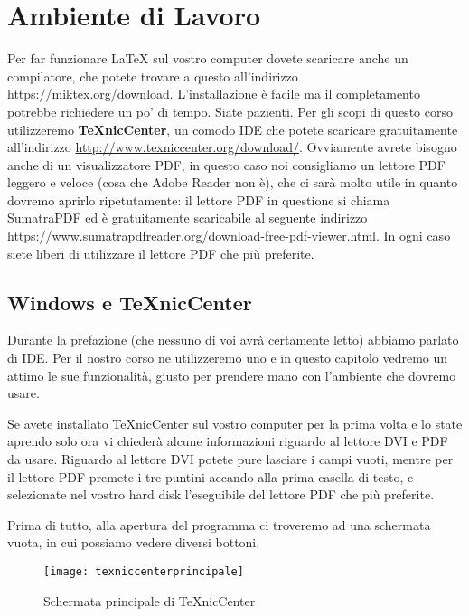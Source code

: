 \chapter{ Ambiente di Lavoro}

Per far funzionare \LaTeX{} sul vostro computer dovete scaricare anche un
compilatore, che potete trovare a questo all'indirizzo
\url{https://miktex.org/download}. L'installazione è facile ma il completamento
potrebbe richiedere un po' di tempo. Siate pazienti.
Per gli scopi di questo corso utilizzeremo \textbf{TeXnicCenter}, un comodo IDE
che potete scaricare gratuitamente all'indirizzo
\url{http://www.texniccenter.org/download/}.
Ovviamente avrete bisogno anche di un visualizzatore PDF, in questo caso noi
consigliamo un lettore PDF leggero e veloce (cosa che Adobe Reader non è), che
ci sarà molto utile in quanto dovremo aprirlo ripetutamente: il lettore PDF in
questione si chiama SumatraPDF ed è gratuitamente scaricabile al seguente
indirizzo \url{https://www.sumatrapdfreader.org/download-free-pdf-viewer.html}.
In ogni caso siete liberi di utilizzare il lettore PDF che più preferite.

\section{Windows e TeXnicCenter}

Durante la prefazione (che nessuno di voi avrà certamente letto) abbiamo
parlato di IDE. Per il nostro corso ne utilizzeremo uno e in questo
capitolo vedremo un attimo le sue funzionalità, giusto per prendere mano
con l'ambiente che dovremo usare.

Se avete installato TeXnicCenter sul vostro computer per la prima volta e lo
state aprendo solo ora vi chiederà alcune informazioni riguardo al lettore DVI
e PDF da usare. Riguardo al lettore DVI potete pure lasciare i campi vuoti,
mentre per il lettore PDF premete i tre puntini accando alla prima casella di
testo, e selezionate nel vostro hard disk l'eseguibile del lettore PDF che più
preferite.

Prima di tutto, alla apertura del programma ci troveremo ad una schermata
vuota, in cui possiamo vedere diversi bottoni.

\begin{figure}[H]
  \centering
  \texttt{[image: texniccenterprincipale]}
  \caption{Schermata principale di TeXnicCenter}
\end{figure}

